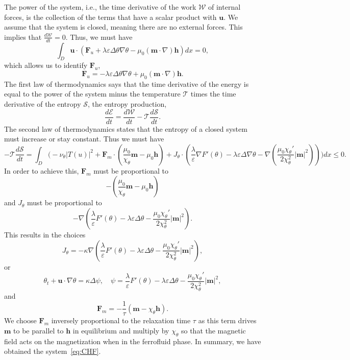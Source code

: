 \documentclass[10pt,letterpaper,twoside]{amsart}
\theoremstyle{definition}{\newtheorem{definition}[lemma]{Definition}}
\theoremstyle{note}{\newtheorem{claim}{Claim}[section]
\newtheorem*{claim*}{Claim}}
\numberwithin{equation}{section}
\newcommand{\dom}{D}
\newcommand{\Grad}{\nabla}
\newcommand{\bu}{\mathbf{u}}
\newcommand{\bm}{\mathbf{m}}
\newcommand{\Fu}{\mathbf{F}_u}
\newcommand{\Fm}{\mathbf{F}_m}
\newcommand{\Jtheta}{J_\theta}
\newcommand{\bh}{\mathbf{h}}
\begin{document}
The power of the system, i.e., the time derivative of the work $\mathcal{W}$ of internal forces, is the collection of the terms that have a scalar product with $\bu$. We assume that the system is closed, meaning there are no external forces. This implies that $\frac{d\mathcal{W}}{dt}=0$. Thus, we must have
\begin{equation*}
	\int_{\dom}  \bu\cdot \left(\Fu +\lambda \varepsilon \Delta\theta \Grad \theta  -\mu_0 (\bm\cdot\Grad)\bh \right)   dx =0, 
\end{equation*}
which allows us to identify $\Fu$,
\begin{equation}\label{eq:Fu}
	\Fu = -\lambda \varepsilon \Delta\theta \Grad \theta  +\mu_0 (\bm\cdot\Grad)\bh.
\end{equation}
The first law of thermodynamics says that the time derivative of the energy is equal to the power of the system minus the temperature $\mathcal{T}$ times the time derivative of the entropy $\mathcal{S}$, the entropy production,
\begin{equation*}
	\frac{d\mathcal{E}}{dt} = \frac{d\mathcal{W}}{dt}-\mathcal{T}\frac{d\mathcal{S}}{dt}.
\end{equation*}
The second law of thermodynamics states that the entropy of a closed system must increase or stay constant. Thus we must have
\begin{equation*}
	-\mathcal{T}\frac{d\mathcal{S}}{dt} =  \int_{\dom} \Bigg(- \nu_\theta |T(u)|^2  +\Fm\cdot\left( \frac{\mu_0}{\chi_\theta}\bm -\mu_0\bh\right)    +\Jtheta\cdot\left(\frac{\lambda}{\varepsilon}\Grad F'(\theta) -\lambda \varepsilon \Delta\Grad\theta-\Grad\left(\frac{\mu_0 \chi_\theta'}{2\chi_\theta^2 }|\bm|^2\right) \right)  \Bigg) dx    \leq 0.
\end{equation*}
In order to achieve this, $\Fm$ must be proportional to 
$$-\left( \frac{\mu_0}{\chi_\theta}\bm -\mu_0\bh\right) $$
and $\Jtheta$ must be proportional to 
$$-\Grad\left(\frac{\lambda}{\varepsilon}  F'(\theta) -\lambda \varepsilon \Delta \theta-  \frac{\mu_0 \chi_\theta'}{2\chi_\theta^2 }|\bm|^2 \right).$$
This results in the choices
\begin{equation*}
	\Jtheta = -\kappa \Grad\left(\frac{\lambda}{\varepsilon}  F'(\theta) -\lambda \varepsilon \Delta \theta-  \frac{\mu_0 \chi_\theta'}{2\chi_\theta^2 }|\bm|^2 \right),
\end{equation*}
or 
\begin{equation*}
	\theta_t +\bu\cdot\Grad\theta = \kappa\Delta\psi,\quad \psi = \frac{\lambda}{\varepsilon}  F'(\theta) -\lambda \varepsilon \Delta \theta-  \frac{\mu_0 \chi_\theta'}{2\chi_\theta^2 }|\bm|^2, 
\end{equation*}
and 
\begin{equation*}
	\Fm = -\frac{1}{\tau}(\bm-\chi_\theta\bh).
\end{equation*}
We choose $\Fm$ inversely proportional to the relaxation time $\tau$ as this term drives $\bm$ to be parallel to $\bh$ in equilibrium and multiply by $\chi_\theta$ so that the magnetic field acts on the magnetization when in the ferrofluid phase. In summary, we have obtained the system~\eqref{eq:CHF}.
\end{document}
